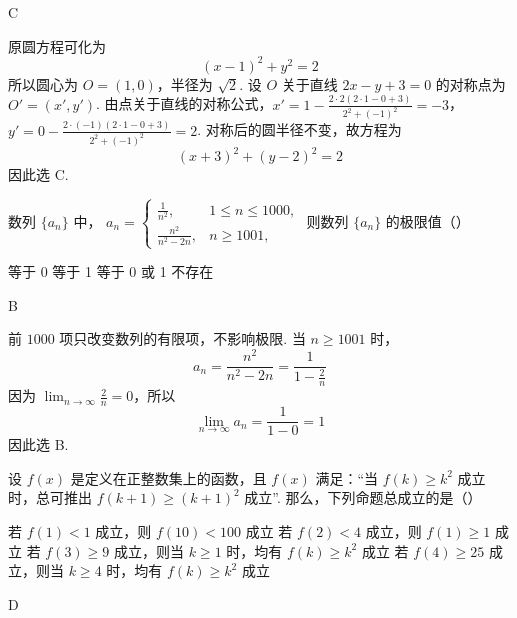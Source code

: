 \begin{answer}
C
\end{answer}

\begin{solution}
原圆方程可化为
\[
(x-1)^2+y^2=2
\]
所以圆心为 \(O=(1,0)\)，半径为 \(\sqrt{2}\). 设 \(O\) 关于直线 \(2x-y+3=0\) 的对称点为 \(O'=(x',y')\). 由点关于直线的对称公式，\(x'=1-\frac{2\cdot2(2\cdot1-0+3)}{2^2+(-1)^2}=-3\)，\(y'=0-\frac{2\cdot(-1)(2\cdot1-0+3)}{2^2+(-1)^2}=2\).
对称后的圆半径不变，故方程为
\[
(x+3)^2+(y-2)^2=2
\]
因此选 C.
\end{solution}

\begin{problem}
数列 \(\{a_{n}\}\) 中， \(a_{n} = \begin{cases}
\frac{1}{n^{2}}, & 1 \leqslant n \leqslant 1000,\\
\frac{n^{2}}{n^{2} - 2n}, & n \geqslant 1001,
\end{cases}\)
则数列 \(\{a_{n}\}\) 的极限值（\quad）

\choices
    {等于 0}
    {等于 1}
    {等于 0 或 1}
    {不存在}
\end{problem}

\begin{answer}
B
\end{answer}

\begin{solution}
前 \(1000\) 项只改变数列的有限项，不影响极限. 当 \(n\geqslant1001\) 时，
\[
a_n=\frac{n^2}{n^2-2n}=\frac{1}{1-\frac{2}{n}}
\]
因为 \(\displaystyle\lim_{n\to\infty}\frac{2}{n}=0\)，所以
\[
\lim_{n\to\infty}a_n=\frac{1}{1-0}=1
\]
因此选 B.
\end{solution}

\begin{problem}
设 \(f(x)\) 是定义在正整数集上的函数，且 \(f(x)\) 满足：“当 \(f(k) \geq k^2\) 成立时，总可推出 \(f(k+1) \geq (k+1)^2\) 成立”. 那么，下列命题总成立的是（\quad）

\choices
    {若 \(f(1) < 1\) 成立，则 \(f(10) < 100\) 成立}
    {若 \(f(2) < 4\) 成立，则 \(f(1) \geqslant 1\) 成立}
    {若 \(f(3) \geqslant 9\) 成立，则当 \(k \geqslant 1\) 时，均有 \(f(k) \geqslant k^2\) 成立}
    {若 \(f(4) \geqslant 25\) 成立，则当 \(k \geqslant 4\) 时，均有 \(f(k) \geqslant k^2\) 成立}
\end{problem}

\begin{answer}
D
\end{answer}

